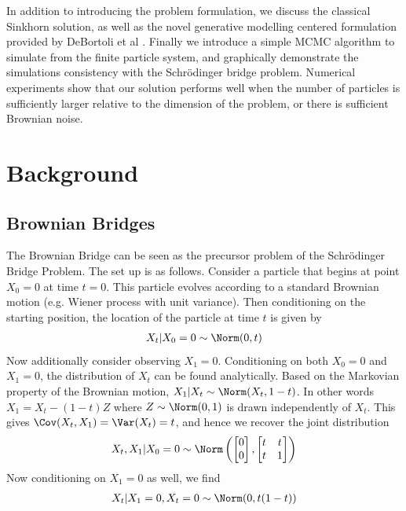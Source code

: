 \documentclass{article}
\begin{document}
In addition to introducing the problem formulation, we discuss the classical
Sinkhorn solution, as well as the novel generative modelling centered
formulation provided by DeBortoli et al
\cite{debortoli2023diffusionschrodingerbridgeapplications}.  Finally we
introduce a simple MCMC algorithm to simulate from the finite particle system,
and graphically demonstrate the simulations consistency with the 
Schrödinger bridge problem. Numerical experiments show that our solution
performs well when the number of particles is sufficiently larger relative to
the dimension of the problem, or there is sufficient Brownian noise.

\section{Background}
\subsection{Brownian Bridges}
The Brownian Bridge can be seen as the precursor problem of the Schrödinger
Bridge Problem. The set up is as follows.  Consider a particle that begins at point $X_0
= 0$ at time $t=0$. This particle evolves according to a standard Brownian
motion (e.g. Wiener process with unit variance). Then conditioning on the
starting position, the location of the particle at time $t$ is given by 
\begin{align}
    X_t|X_0 = 0 \sim \Norm(0, t)
\end{align}
Now additionally consider observing $X_1 = 0$. Conditioning on both $X_0 = 0$
and $X_1 = 0$, the distribution of $X_t$ can be found analytically. Based on the
Markovian property of the Brownian motion, $X_1 | X_t \sim \Norm(X_t, 1-t)$.
In other words $X_1 = X_t - (1-t) Z$ where $Z \sim \Norm(0,1)$ is drawn
independently of $X_t$. This gives $\Cov(X_t, X_1) = \Var(X_t) = t$, and hence
we recover the joint distribution 
\begin{align}
    X_t, X_1 | X_0 = 0 \sim \Norm\left( 
        \begin{bmatrix} 0 \\ 0 \end{bmatrix},
        \begin{bmatrix}
            t & t \\
            t & 1
        \end{bmatrix}
    \right)
\end{align}
Now conditioning on $X_1 = 0$ as well, we find
\begin{align}
    X_t | X_1 = 0, X_t = 0 \sim \Norm(0, t(1-t))
\end{align}
\end{document}

